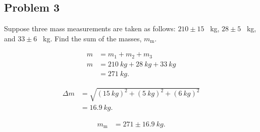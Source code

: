 
\subsection{Problem 3}

Suppose three mass measurements are taken as follows: $210 \pm 15$ \SI{}{kg}, $28 \pm 5$ \SI{}{kg}, and $33 \pm 6$ \SI{}{kg}. Find the sum of the masses, $m_{\mathrm{m}}$.

\begin{align*}
	m &= m_1 + m_2 + m_3 \\
	m &= \SI{210}{kg} + \SI{28}{kg} + \SI{33}{kg} \\
	&= \SI{271}{kg}
	.\end{align*}

\begin{align*}
	\Delta m &= \sqrt{\left( \SI{15}{kg} \right)^2 + \left( \SI{5}{kg} \right)^2 + \left( \SI{6}{kg} \right)^2} \\
	&= \SI{16.9}{kg}
	.\end{align*}

\begin{align*}
	m_{\mathrm{m}} &= 271 \pm \SI{16.9}{kg}
	.\end{align*}
